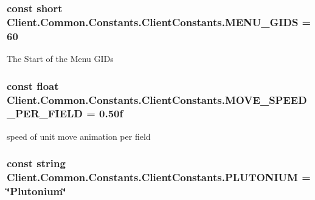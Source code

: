 \subsubsection[{M\+E\+N\+U\+\_\+\+G\+I\+D\+S}]{\setlength{\rightskip}{0pt plus 5cm}const short Client.\+Common.\+Constants.\+Client\+Constants.\+M\+E\+N\+U\+\_\+\+G\+I\+D\+S = 60}\label{classClient_1_1Common_1_1Constants_1_1ClientConstants_a4d3b0e4f36481c991c9995cb20c9347d}


The Start of the Menu G\+I\+Ds 

\hypertarget{classClient_1_1Common_1_1Constants_1_1ClientConstants_a1c210518a89a9a7d1f93bc3da1ff0caf}{}
\subsubsection[{M\+O\+V\+E\+\_\+\+S\+P\+E\+E\+D\+\_\+\+P\+E\+R\+\_\+\+F\+I\+E\+L\+D}]{\setlength{\rightskip}{0pt plus 5cm}const float Client.\+Common.\+Constants.\+Client\+Constants.\+M\+O\+V\+E\+\_\+\+S\+P\+E\+E\+D\+\_\+\+P\+E\+R\+\_\+\+F\+I\+E\+L\+D = 0.\+50f}\label{classClient_1_1Common_1_1Constants_1_1ClientConstants_a1c210518a89a9a7d1f93bc3da1ff0caf}


speed of unit move animation per field 

\hypertarget{classClient_1_1Common_1_1Constants_1_1ClientConstants_a86ed3d6f7915b53dbe14380c01527f9a}{}
\subsubsection[{P\+L\+U\+T\+O\+N\+I\+U\+M}]{\setlength{\rightskip}{0pt plus 5cm}const string Client.\+Common.\+Constants.\+Client\+Constants.\+P\+L\+U\+T\+O\+N\+I\+U\+M = \char`\"{}Plutonium\char`\"{}}\label{classClient_1_1Common_1_1Constants_1_1ClientConstants_a86ed3d6f7915b53dbe14380c01527f9a}


